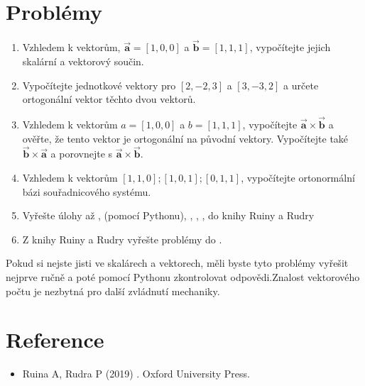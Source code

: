 \documentclass[letterpaper,10pt,english]{jupyterBook}
\begin{document}
\section{Problémy}
\label{\detokenize{Prednasky/0_2_Skal_xe1ry_a_vektory:problemy}}\begin{enumerate}
%
\item {} 
\sphinxAtStartPar
Vzhledem k vektorům, \(\overrightarrow{\mathbf{a}}=[1, 0, 0]\) a \(\overrightarrow{\mathbf{b}}=[1, 1, 1]\), vypočítejte jejich skalární a vektorový součin.

\item {} 
\sphinxAtStartPar
Vypočítejte jednotkové vektory pro \( [2, −2, 3] \) a \( [3, −3, 2] \) a určete ortogonální vektor těchto dvou vektorů.

\item {} 
\sphinxAtStartPar
Vzhledem k vektorům \(a = [1, 0, 0]\) a \(b = [1, 1, 1]\), vypočítejte \(\overrightarrow{\mathbf{a}} \times \overrightarrow{\mathbf{b}}\)  a ověřte, že tento vektor je ortogonální na původní vektory. Vypočítejte také  \(\overrightarrow{\mathbf{b}} \times \overrightarrow{\mathbf{a}}\) a porovnejte s  \(\overrightarrow{\mathbf{a}} \times \overrightarrow{\mathbf{b}}\).

\item {} 
\sphinxAtStartPar
Vzhledem k vektorům \( [1, 1, 0]; [1, 0, 1]; [0, 1, 1] \), vypočítejte ortonormální bázi souřadnicového systému.

\item {} 
\sphinxAtStartPar
Vyřešte úlohy   až ,  (pomocí Pythonu), , , ,  do  knihy Ruiny a Rudry

\item {} 
\sphinxAtStartPar
Z knihy Ruiny a Rudry vyřešte problémy  do .

\end{enumerate}

\sphinxAtStartPar
Pokud si nejste jisti ve skalárech a vektorech, měli byste tyto problémy vyřešit nejprve ručně a poté pomocí Pythonu zkontrolovat odpovědi.Znalost vektorového počtu je nezbytná pro další zvládnutí mechaniky.


\section{Reference}
\label{\detokenize{Prednasky/0_2_Skal_xe1ry_a_vektory:reference}}\begin{itemize}
\item {} 
\sphinxAtStartPar
Ruina A, Rudra P (2019) . Oxford University Press.

\end{itemize}
\end{document}
